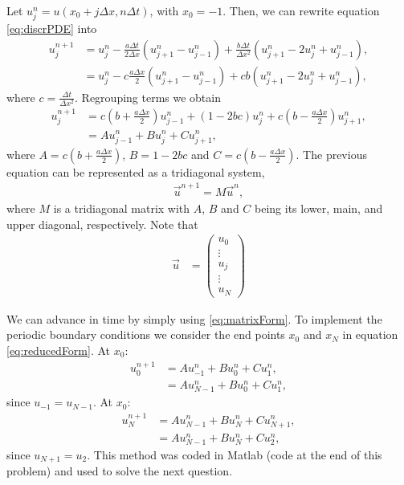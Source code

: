 \begin{questions}

\begin{solution}
Let $u_j^n = u(x_0+j\Delta x,n\Delta t)$, with $x_0 = -1$. Then, we can rewrite equation \eqref{eq:discrPDE} into
\begin{align*}
u_j^{n+1} &= u_j^n - \frac{a\Delta t}{2\Delta x}\left(u_{j+1}^n-u_{j-1}^n\right) + \frac{b\Delta t}{\Delta x^2}\left(u_{j+1}^n-2u_{j}^n+u_{j-1}^n\right),\\
&= u_j^n - c\frac{a\Delta x}{2}\left(u_{j+1}^n-u_{j-1}^n\right) + cb\left(u_{j+1}^n-2u_{j}^n+u_{j-1}^n\right),
\end{align*}
where $c = \frac{\Delta t}{\Delta x^2}$. Regrouping terms we obtain
\begin{align}\label{eq:reducedForm}
u_j^{n+1} &= c\left(b+\frac{a\Delta x}{2}\right)u_{j-1}^n + \left(1-2bc\right)u_j^n + c\left(b-\frac{a\Delta x}{2}\right)u_{j+1}^n,\nonumber\\
&= Au_{j-1}^n +Bu_j^n + Cu_{j+1}^n,
\end{align}
where $A = c\left(b+\frac{a\Delta x}{2}\right)$, $B = 1-2bc$ and $C = c\left(b-\frac{a\Delta x}{2}\right)$. The previous equation can be represented as a tridiagonal system,
\begin{align}\label{eq:matrixForm}
\vec{u}^{n+1} = M\vec{u}^n,
\end{align}
where $M$ is a tridiagonal matrix with $A$, $B$ and $C$ being its lower, main, and upper diagonal, respectively. Note that 
\begin{align*}
\vec{u} &= \left(\begin{matrix}
           u_{0} \\
           \vdots \\
           u_{j} \\
           \vdots \\
           u_{N}
         \end{matrix}\right)
\end{align*}

We can advance in time by simply using \eqref{eq:matrixForm}. To implement the periodic boundary conditions we consider the end points $x_0$ and $x_N$ in equation \eqref{eq:reducedForm}.
At $x_0$:
\begin{align*}
u_0^{n+1} &= Au_{-1}^n +Bu_0^n + Cu_{1}^n,\\
&= Au_{N-1}^n +Bu_0^n + Cu_{1}^n,
\end{align*}
since $u_{-1} = u_{N-1}$.
At $x_0$:
\begin{align*}
u_N^{n+1} &= Au_{N-1}^n +Bu_N^n + Cu_{N+1}^n,\\
&= Au_{N-1}^n +Bu_N^n + Cu_{2}^n,
\end{align*}
since $u_{N+1} = u_{2}$. This method was coded in Matlab (code at the end of this problem) and used to solve the next question.
\end{solution}


\end{questions}
